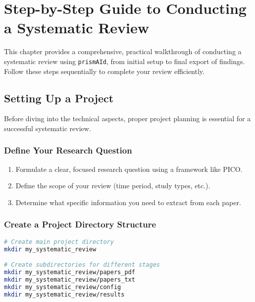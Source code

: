 \chapter{Step-by-Step Guide to Conducting a Systematic Review} \label{chap:walkthrough}

This chapter provides a comprehensive, practical walkthrough of conducting a systematic review using \texttt{prismAId}, from initial setup to final export of findings. Follow these steps sequentially to complete your review efficiently.

\section{Setting Up a Project}

Before diving into the technical aspects, proper project planning is essential for a successful systematic review.

\subsection{Define Your Research Question}

\begin{enumerate}
    \item Formulate a clear, focused research question using a framework like PICO.
    \item Define the scope of your review (time period, study types, etc.).
    \item Determine what specific information you need to extract from each paper.
\end{enumerate}


\subsection{Create a Project Directory Structure}

\begin{commandbox}
\begin{lstlisting}[language=Bash]
# Create main project directory
mkdir my_systematic_review

# Create subdirectories for different stages
mkdir my_systematic_review/papers_pdf
mkdir my_systematic_review/papers_txt
mkdir my_systematic_review/config
mkdir my_systematic_review/results
\end{lstlisting}
\end{commandbox}

